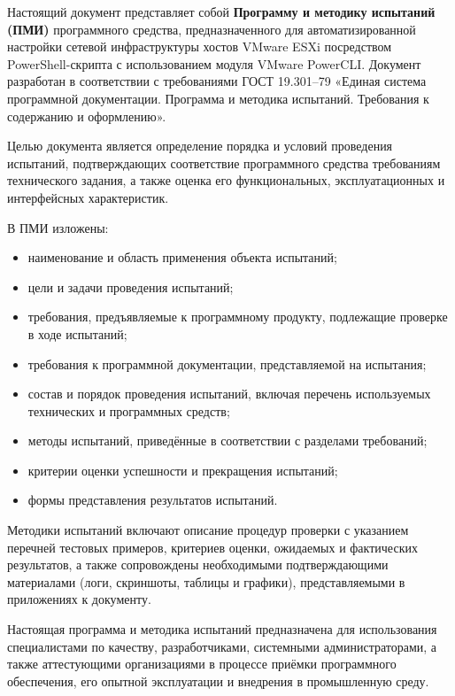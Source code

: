\newpage\annotation

Настоящий документ представляет собой \textbf{Программу и методику испытаний (ПМИ)} программного средства, предназначенного для автоматизированной настройки сетевой инфраструктуры хостов VMware ESXi посредством PowerShell-скрипта с использованием модуля VMware PowerCLI. Документ разработан в соответствии с требованиями ГОСТ 19.301–79 «Единая система программной документации. Программа и методика испытаний. Требования к содержанию и оформлению».

Целью документа является определение порядка и условий проведения испытаний, подтверждающих соответствие программного средства требованиям технического задания, а также оценка его функциональных, эксплуатационных и интерфейсных характеристик.

В ПМИ изложены:

\begin{itemize}
    \item наименование и область применения объекта испытаний;
    \item цели и задачи проведения испытаний;
    \item требования, предъявляемые к программному продукту, подлежащие проверке в ходе испытаний;
    \item требования к программной документации, представляемой на испытания;
    \item состав и порядок проведения испытаний, включая перечень используемых технических и программных средств;
    \item методы испытаний, приведённые в соответствии с разделами требований;
    \item критерии оценки успешности и прекращения испытаний;
    \item формы представления результатов испытаний.
\end{itemize}

Методики испытаний включают описание процедур проверки с указанием перечней тестовых примеров, критериев оценки, ожидаемых и фактических результатов, а также сопровождены необходимыми подтверждающими материалами (логи, скриншоты, таблицы и графики), представляемыми в приложениях к документу.

Настоящая программа и методика испытаний предназначена для использования специалистами по качеству, разработчиками, системными администраторами, а также аттестующими организациями в процессе приёмки программного обеспечения, его опытной эксплуатации и внедрения в промышленную среду.

